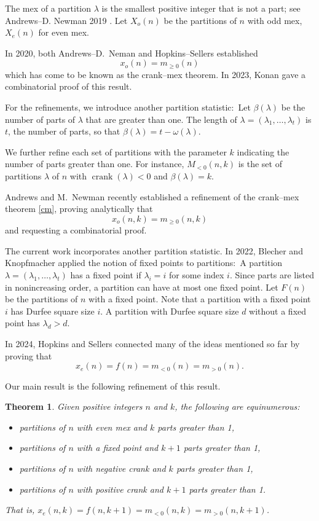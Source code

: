 \documentclass{amsart}
\theoremstyle{theorem}
\newtheorem{theorem}{Theorem}
\theoremstyle{definition}
\DeclareMathOperator{\ck}{crank}
\begin{document}
The mex of a partition $\lambda$ is the smallest positive integer that is not a part; see Andrews--D. Newman 2019 \cite{an19}.  Let $X_o(n)$ be the partitions of $n$ with odd mex, $X_e(n)$ for even mex.

In 2020, both Andrews--D.\ Neman \cite{an20} and Hopkins--Sellers \cite{hs20} established
\begin{equation}
x_o(n) = m_{\ge 0}(n) \label{cm}
\end{equation}
which has come to be known as the crank--mex theorem.  In 2023, Konan \cite{k} gave a combinatorial proof of this result.

For the refinements, we introduce another partition statistic:\ Let $\beta(\lambda)$ be the number of parts of $\lambda$ that are greater than one.  The length of $\lambda =  (\lambda_1, \ldots, \lambda_t)$ is $t$, the number of parts, so that $\beta(\lambda) = t - \omega(\lambda)$.

We further refine each set of partitions with the parameter $k$ indicating the number of parts greater than one.  For instance, $M_{<0}(n,k)$ is the set of partitions $\lambda$ of $n$ with $\ck(\lambda) < 0$ and $\beta(\lambda) = k$.

Andrews and M.\ Newman recently established a refinement of the crank--mex theorem \eqref{cm}, proving analytically that
\[x_o(n,k) = m_{\ge 0}(n,k)\]
and requesting a combinatorial proof.

The current work incorporates another partition statistic.  In 2022, Blecher and Knopfmacher \cite{bk} applied the notion of fixed points to partitions:\ A partition $\lambda = (\lambda_1, \ldots, \lambda_t)$ has a fixed point if $\lambda_i = i$ for some index $i$.  Since parts are listed in nonincreasing order, a partition can have at most one fixed point.  Let $F(n)$ be the partitions of $n$ with a fixed point.  Note that a partition with a fixed point $i$ has Durfee square size $i$.  A partition with Durfee square size $d$ without a fixed point has $\lambda_d > d$.

In 2024, Hopkins and Sellers \cite{hs24} connected many of the ideas mentioned so far by proving that
\[ x_e(n) = f(n) = m_{< 0}(n) = m_{> 0}(n).\]

Our main result is the following refinement of this result.

\begin{theorem} \label{big}
Given positive integers $n$ and $k$, the following are equinumerous:
\begin{itemize}
\item[(a)] partitions of $n$ with even mex and $k$ parts greater than 1,
\item[(b)] partitions of $n$ with a fixed point and $k+1$ parts greater than 1,
\item[(c)] partitions of $n$ with negative crank and $k$ parts greater than 1,
\item[(d)] partitions of $n$ with positive crank and $k+1$ parts greater than 1.
\end{itemize}
That is, $x_e(n,k) = f(n,k+1) = m_{<0}(n,k) = m_{>0}(n,k+1)$.
\end{theorem}
\end{document}
